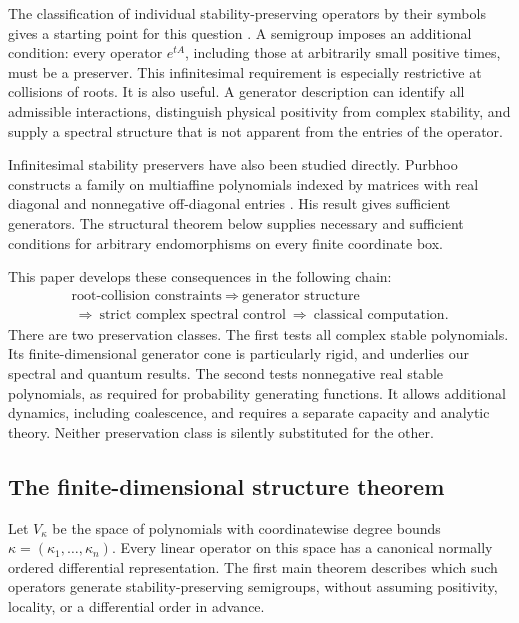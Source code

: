 \documentclass[reqno]{amsart}
\theoremstyle{definition}
\theoremstyle{remark}
\begin{document}
The classification of individual stability-preserving operators by their
symbols gives a starting point for this question
\cite{BB09,BB10,BB10II}. A semigroup imposes an additional condition:
every operator $e^{tA}$, including those at arbitrarily small positive
times, must be a preserver. This infinitesimal requirement is especially
restrictive at collisions of roots. It is also useful. A generator
description can identify all admissible interactions, distinguish
physical positivity from complex stability, and supply a spectral
structure that is not apparent from the entries of the operator.

Infinitesimal stability preservers have also been studied directly.
Purbhoo constructs a family on multiaffine polynomials indexed by
matrices with real diagonal and nonnegative off-diagonal entries
\cite[Proposition~4.5]{Purbhoo18}. His result gives sufficient
generators. The structural theorem below supplies necessary and
sufficient conditions for arbitrary endomorphisms on every finite
coordinate box.

This paper develops these consequences in the following chain:
\[
 \begin{gathered}
 \text{root-collision constraints}
 \ \Longrightarrow\
 \text{generator structure}\\
 \ \Longrightarrow\
 \text{strict complex spectral control}
 \ \Longrightarrow\
 \text{classical computation}.
 \end{gathered}
\]
There are two preservation classes. The first tests all complex stable
polynomials. Its finite-dimensional generator cone is particularly rigid,
and underlies our spectral and quantum results. The second tests
nonnegative real stable polynomials, as required for probability
generating functions. It allows additional dynamics, including
coalescence, and requires a separate capacity and analytic theory.
Neither preservation class is silently substituted for the other.

\subsection{The finite-dimensional structure theorem}

Let $V_\kappa$ be the space of polynomials with coordinatewise degree
bounds $\kappa=(\kappa_1,\ldots,\kappa_n)$. Every linear operator on this
space has a canonical normally ordered differential representation.
The first main theorem describes which such operators generate
stability-preserving semigroups, without assuming positivity, locality,
or a differential order in advance.
\end{document}
